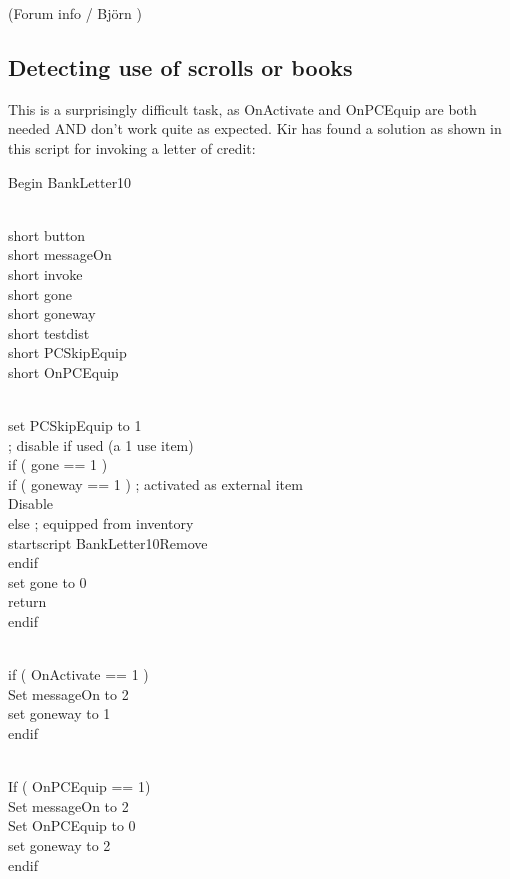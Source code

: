 \documentclass[
]{article}
\begin{document}
(Forum info / Björn )

\hypertarget{detecting-use-of-scrolls-or-books}{%
\subsection{\texorpdfstring{\hfill\break
Detecting use of scrolls or
books}{ Detecting use of scrolls or books}}\label{detecting-use-of-scrolls-or-books}}

This is a surprisingly difficult task, as OnActivate and OnPCEquip are
both needed AND don't work quite as expected. Kir has found a solution
as shown in this script for invoking a letter of credit:

Begin BankLetter10\\
\strut \\
short button\\
short messageOn\\
short invoke\\
short gone\\
short goneway\\
short testdist\\
short PCSkipEquip\\
short OnPCEquip\\
\strut \\
set PCSkipEquip to 1\\
; disable if used (a 1 use item)\\
if ( gone == 1 )\\
if ( goneway == 1 ) ; activated as external item\\
Disable\\
else ; equipped from inventory\\
startscript BankLetter10Remove\\
endif\\
set gone to 0\\
return\\
endif\\
\strut \\
if ( OnActivate == 1 )\\
Set messageOn to 2\\
set goneway to 1\\
endif\\
\strut \\
If ( OnPCEquip == 1)\\
Set messageOn to 2\\
Set OnPCEquip to 0\\
set goneway to 2\\
endif\\
\end{document}
